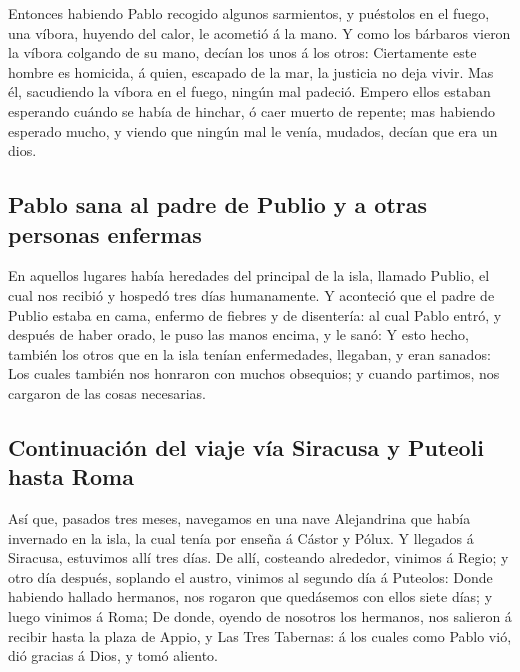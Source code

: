  Entonces habiendo Pablo recogido algunos sarmientos, y
puéstolos en el fuego, una víbora, huyendo del calor, le acometió á la
mano.  Y como los bárbaros vieron la víbora colgando de su
mano, decían los unos á los otros: Ciertamente este hombre es homicida,
á quien, escapado de la mar, la justicia no deja vivir. 
Mas él, sacudiendo la víbora en el fuego, ningún mal padeció.
 Empero ellos estaban esperando cuándo se había de
hinchar, ó caer muerto de repente; mas habiendo esperado mucho, y viendo
que ningún mal le venía, mudados, decían que era un dios.

\hypertarget{pablo-sana-al-padre-de-publio-y-a-otras-personas-enfermas}{%
\subsection{Pablo sana al padre de Publio y a otras personas
enfermas}\label{pablo-sana-al-padre-de-publio-y-a-otras-personas-enfermas}}

 En aquellos lugares había heredades del principal de la
isla, llamado Publio, el cual nos recibió y hospedó tres días
humanamente.  Y aconteció que el padre de Publio estaba en
cama, enfermo de fiebres y de disentería: al cual Pablo entró, y después
de haber orado, le puso las manos encima, y le sanó:  Y
esto hecho, también los otros que en la isla tenían enfermedades,
llegaban, y eran sanados:  Los cuales también nos
honraron con muchos obsequios; y cuando partimos, nos cargaron de las
cosas necesarias.

\hypertarget{continuaciuxf3n-del-viaje-vuxeda-siracusa-y-puteoli-hasta-roma}{%
\subsection{Continuación del viaje vía Siracusa y Puteoli hasta
Roma}\label{continuaciuxf3n-del-viaje-vuxeda-siracusa-y-puteoli-hasta-roma}}

 Así que, pasados tres meses, navegamos en una nave
Alejandrina que había invernado en la isla, la cual tenía por enseña á
Cástor y Pólux.  Y llegados á Siracusa, estuvimos allí
tres días.  De allí, costeando alrededor, vinimos á
Regio; y otro día después, soplando el austro, vinimos al segundo día á
Puteolos:  Donde habiendo hallado hermanos, nos rogaron
que quedásemos con ellos siete días; y luego vinimos á Roma;
 De donde, oyendo de nosotros los hermanos, nos salieron
á recibir hasta la plaza de Appio, y Las Tres Tabernas: á los cuales
como Pablo vió, dió gracias á Dios, y tomó aliento.

